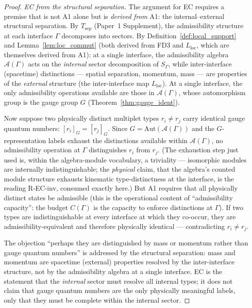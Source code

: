 \documentclass[11pt]{article}
\theoremstyle{definition}
\begin{document}
\begin{proof}
\textit{EC from the structural separation.}\quad
The argument for EC requires a premise that is not A1 alone but is
\emph{derived from} A1: the internal--external structural separation.
By $T_{\mathrm{sep}}$ (Paper~1 Supplement), the admissibility structure
at each interface $\Gamma$ decomposes into sectors.  By
Definition~\ref{def:local_support} and Lemma~\ref{lem:loc_commut}
(both derived from FD3 and $L_{\mathrm{loc}}$, which are themselves
derived from A1): at a single interface, the admissibility algebra
$\mathcal{A}(\Gamma)$ acts on the \emph{internal} sector decomposition
of $S_\Gamma$, while inter-interface (spacetime) distinctions
--- spatial separation, momentum, mass --- are properties of the
\emph{external} structure (the inter-interface map
$L_{\mathrm{loc}}$).  At a single interface, the only admissibility
operations available are those in $\mathcal{A}(\Gamma)$, whose
automorphism group is the gauge group $G$
(Theorem~\ref{thm:gauge_ident}).

Now suppose two physically distinct multiplet types $r_i \ne r_j$
carry identical gauge quantum numbers: $[r_i]_G = [r_j]_G$.  Since
$G = \mathrm{Aut}(\mathcal{A}(\Gamma))$ and the $G$-representation
labels exhaust the distinctions available within
$\mathcal{A}(\Gamma)$, no admissibility operation at $\Gamma$
distinguishes $r_i$ from $r_j$.  (The exhaustion step just used is,
within the algebra-module vocabulary, a triviality --- isomorphic
modules are internally indistinguishable; the \emph{physical} claim,
that the algebra's counted module structure exhausts kinematic
type-distinctness at the interface, is the reading R-EC-inv, consumed
exactly here.)  But A1 requires that all physically
distinct states be admissible (this is the operational content of
``admissibility capacity'': the budget $C(\Gamma)$ is the capacity to
enforce distinctions at $\Gamma$).  If two types are indistinguishable
at every interface at which they co-occur, they are admissibility-equivalent
and therefore physically identical --- contradicting $r_i \ne r_j$.

The objection ``perhaps they are distinguished by mass or momentum
rather than gauge quantum numbers'' is addressed by the structural
separation: mass and momentum are spacetime (external) properties
resolved by the inter-interface structure, not by the admissibility
algebra at a single interface.  EC is the statement that the
\emph{internal} sector must resolve all internal types; it does not
claim that gauge quantum numbers are the only physically meaningful
labels, only that they must be complete within the internal sector.


\end{proof}
\end{document}
